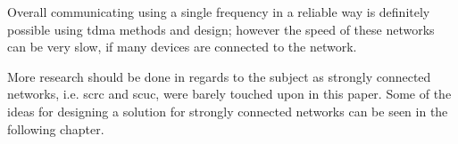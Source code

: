 \bigskip\noindent%
Overall communicating using a single frequency in a reliable way is definitely possible using \gls{tdma} methods and design; however the speed of these networks can be very slow, if many devices are connected to the network.

More research should be done in regards to the subject as strongly connected networks, i.e. \gls{scrc} and \gls{scuc}, were barely touched upon in this paper.
Some of the ideas for designing a solution for strongly connected networks can be seen in the following chapter.